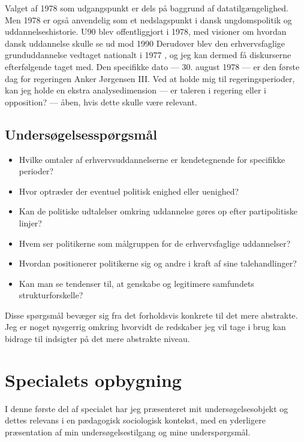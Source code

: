 Valget af 1978 som udgangspunkt er dels på baggrund af datatilgængelighed.
Men 1978 er også anvendelig som et nedslagspunkt i dansk ungdomspolitik og uddannelseshistorie.
U90 blev offentliggjort i 1978, med visioner om hvordan dansk uddannelse skulle se ud mod 1990 \autocite{undervisningsministeriet90SamletUddannelsesplanlaegning1978}
Derudover blev den erhvervsfaglige grunduddannelse vedtaget nationalt i 1977 \autocite{thewikipediavolunteersEFG2019}, og jeg kan dermed få diskurserne efterfølgende taget med.
Den specifikke dato — 30. august 1978 — er den første dag for regeringen Anker Jørgensen III.
Ved at holde mig til regeringsperioder, kan jeg holde en ekstra analysedimension — er taleren i regering eller i opposition? — åben, hvis dette skulle være relevant.

\section{Undersøgelsesspørgsmål}\label{seq:resqs}

\begin{itemize}
  \item
    Hvilke omtaler af erhvervsuddannelserne er kendetegnende for specifikke perioder?
  \item
    Hvor optræder der eventuel politisk enighed eller uenighed?
  \item
    Kan de politiske udtalelser omkring uddannelse gøres op efter partipolitiske linjer?
  \item
    Hvem ser politikerne som målgruppen for de erhvervsfaglige uddannelser?
  \item
    Hvordan positionerer politikerne sig og andre i kraft af sine talehandlinger?
  \item
    Kan man se tendenser til, at genskabe og legitimere samfundets strukturforskelle?
\end{itemize}

Disse spørgsmål bevæger sig fra det forholdsvis konkrete til det mere abstrakte.
Jeg er noget nysgerrig omkring hvorvidt de redskaber jeg vil tage i brug kan bidrage til indsigter på det mere abstrakte niveau.

\chapter{Specialets opbygning}
I denne første del af specialet har jeg præsenteret mit undersøgelsesobjekt og dettes relevans i en pædagogisk sociologisk kontekst, med en yderligere præsentation af min undersøgelsestilgang og mine underspørgsmål.

